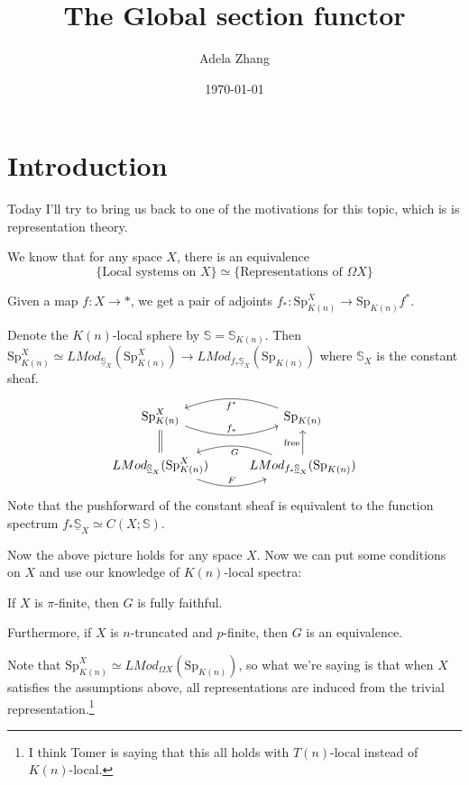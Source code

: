\documentclass{article}
\title{The Global section functor}
\author{Adela Zhang}
\date{\today}
\newcommand{\loops}{\Omega}
\renewcommand{\S}{{\mathbb{S}}}
\newcommand{\Sp}{\text{Sp}}
\theoremstyle{definition} \newtheorem*{defn}{Definition}
\theoremstyle{plain} \newtheorem*{prop}{Proposition}
\theoremstyle{plain} \newtheorem*{lemma}{Lemma}
\theoremstyle{plain} \newtheorem*{cor}{Corollary}
\theoremstyle{remark} \newtheorem*{ex}{Example}
\theoremstyle{remark} \newtheorem*{exs}{Examples}
\theoremstyle{remark} \newtheorem*{nonex}{Non-example}
\theoremstyle{remark} \newtheorem*{rmk}{Remark}
\theoremstyle{remark} \newtheorem*{exc}{Exercise}
\theoremstyle{remark} \newtheorem*{idea}{Idea}
\theoremstyle{remark} \newtheorem*{obs}{Observation}
\theoremstyle{plain} \newtheorem*{theorem}{Theorem}
\theoremstyle{plain} \newtheorem*{conj}{Conjecture}
\theoremstyle{remark} \newtheorem*{q}{Question}
\theoremstyle{definition} \newtheorem*{fact}{Fact}
\theoremstyle{definition} \newtheorem*{facts}{Facts}
\theoremstyle{remark} \newtheorem*{ntn}{Notation}
\theoremstyle{remark} \newtheorem*{goal}{Goal}
\theoremstyle{remark} \newtheorem*{sketch}{Sketch}
\theoremstyle{definition} \newtheorem{claim}{Claim}
\begin{document}
\maketitle

\section{Introduction}

Today I'll try to bring us back to one of the motivations for this topic, which is is representation theory. 

We know that for any space $ X $, there is an equivalence
\begin{equation*}
	\{\text{Local systems on }X\} \simeq \{\text{Representations of } \loops X \}
\end{equation*}

Given a map $ f: X \to * $, we get a pair of adjoints $ f_*: \Sp_{K(n)}^X \to \Sp_{K(n)} f^*$. 

Denote the $ K (n)$-local sphere by $ \S = \S_{K(n)} $. 
Then $ \Sp_{K(n)}^X \simeq LMod_{\underline{\S}_X}(\Sp_{K(n)}^X) \to LMod_{f_*\underline{\S}_X}(\Sp_{K(n)}) $ where $ \S_X $ is the constant sheaf. 
\begin{equation}
\begin{tikzcd}
	\Sp_{K(n)}^X \ar[r, bend right = 20, "f_*"] & \ar[l, bend right=20, "f^*"] \Sp_{K(n)} \\
	 LMod_{\underline{\S}_X}(\Sp_{K(n)}^X) \ar[u, equals] \ar[r, bend right = 20, "F"] & LMod_{f_*\underline{\S}_X}(\Sp_{K(n)}) \ar[u, "\text{free}"] \ar[l, bend right = 20, "G"]
\end{tikzcd}
\end{equation}
Note that the pushforward of the constant sheaf is equivalent to the function spectrum $ f_*\underline{\S}_X \simeq C(X; \S) $. 

Now the above picture holds for any space $ X $. 
Now we can put some conditions on $ X $ and use our knowledge of $ K(n) $-local spectra:

If $ X $ is $ \pi $-finite, then $ G $ is fully faithful. 

Furthermore, if $ X $ is $ n $-truncated and $ p $-finite, then $ G $ is an equivalence. 

Note that $ \Sp_{K(n)}^X \simeq LMod_{\loops X}(\Sp_{K(n)}) $, so what we're saying is that when $ X $ satisfies the assumptions above, all representations are induced from the trivial representation.\footnote{I think Tomer is saying that this all holds with $ T(n) $-local instead of $ K(n) $-local.}
\end{document}
